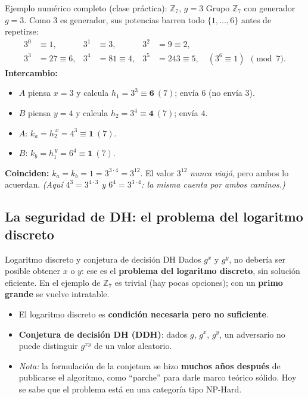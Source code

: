 \documentclass[11pt,a4paper]{article}
\newcommand{\Zn}{\mathbb{Z}}
\begin{document}
\begin{practbox}{Ejemplo numérico completo (clase práctica): $\Zn_7$, $g=3$}
Grupo $\Zn_7$ con generador $g=3$. Como $3$ es generador, sus potencias barren todo
$\{1,\dots,6\}$ antes de repetirse:
\[
\begin{aligned}
  3^0 &\equiv 1, & 3^1 &\equiv 3, & 3^2 &= 9 \equiv 2,\\
  3^3 &= 27 \equiv 6, & 3^4 &= 81 \equiv 4, & 3^5 &= 243 \equiv 5, \quad (3^6\equiv 1)\ \ \pmod 7.
\end{aligned}
\]
\textbf{Intercambio:}
\begin{itemize}[leftmargin=1.4em,itemsep=1pt]
  \item $A$ piensa $x=3$ y calcula $h_1 = 3^3 \equiv \mathbf{6}\ (7)$; envía $6$ (no envía $3$).
  \item $B$ piensa $y=4$ y calcula $h_2 = 3^4 \equiv \mathbf{4}\ (7)$; envía $4$.
  \item $A$: $k_a = h_2^{\,x} = 4^3 \equiv \mathbf{1}\ (7)$.
  \item $B$: $k_b = h_1^{\,y} = 6^4 \equiv \mathbf{1}\ (7)$.
\end{itemize}
\textbf{Coinciden:} $k_a=k_b=1=3^{3\cdot4}=3^{12}$. El valor $3^{12}$ \emph{nunca viajó}, pero
ambos lo acuerdan. \emph{(Aquí $4^3=3^{4\cdot3}$ y $6^4=3^{3\cdot4}$: la misma cuenta por
ambos caminos.)}
\end{practbox}

\subsection{La seguridad de DH: el problema del logaritmo discreto}
\begin{defbox}{Logaritmo discreto y conjetura de decisión DH}
Dados $g^x$ y $g^y$, no debería ser posible obtener $x$ o $y$: ese es el \textbf{problema del
logaritmo discreto}, sin solución eficiente. En el ejemplo de $\Zn_7$ es trivial (hay pocas
opciones); con un \textbf{primo grande} se vuelve intratable.
\begin{itemize}[leftmargin=1.4em,itemsep=1pt]
  \item El logaritmo discreto es \textbf{condición necesaria pero no suficiente}.
  \item \textbf{Conjetura de decisión DH (DDH)}: dados $g$, $g^x$, $g^y$, un adversario no
        puede distinguir $g^{xy}$ de un valor aleatorio.
  \item \emph{Nota:} la formulación de la conjetura se hizo \textbf{muchos años después} de
        publicarse el algoritmo, como ``parche'' para darle marco teórico sólido. Hoy se sabe
        que el problema está en una categoría tipo NP-Hard.
\end{itemize}
\end{defbox}
\end{document}
